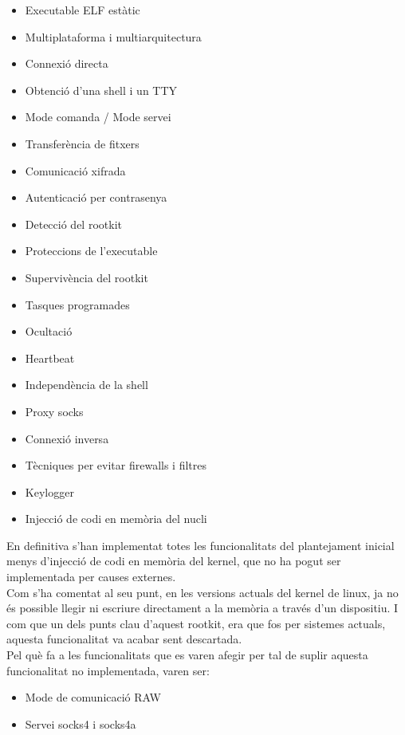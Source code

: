 \begin{itemize}
	\item Executable ELF estàtic
	\item Multiplataforma i multiarquitectura
	\item Connexió directa
	\item Obtenció d'una shell i un TTY
	\item Mode comanda / Mode servei
	\item Transferència de fitxers
	\item Comunicació xifrada
	\item Autenticació per contrasenya
	\item Detecció del rootkit
	\item Proteccions de l'executable
	\item Supervivència del rootkit
	\item Tasques programades
	\item Ocultació
	\item Heartbeat
	\item Independència de la shell
	\item Proxy socks
	\item Connexió inversa
	\item Tècniques per evitar firewalls i filtres
	\item Keylogger
	\item Injecció de codi en memòria del nucli
\end{itemize}

En definitiva s'han implementat totes les funcionalitats del plantejament inicial menys d'injecció de codi 
en memòria del kernel, que no ha pogut ser implementada per causes externes. \\

Com s'ha comentat al seu punt, en les versions actuals del kernel de linux, ja no és possible llegir 
ni escriure directament a la memòria a través d'un dispositiu. I com que un dels punts clau d'aquest 
rootkit, era que fos per sistemes actuals, aquesta funcionalitat va acabar sent descartada. \\

Pel què fa a les funcionalitats que es varen afegir per tal de suplir aquesta funcionalitat no implementada,
varen ser: 
\begin{itemize}
	\item Mode de comunicació RAW
	\item Servei socks4 i socks4a
\end{itemize}


